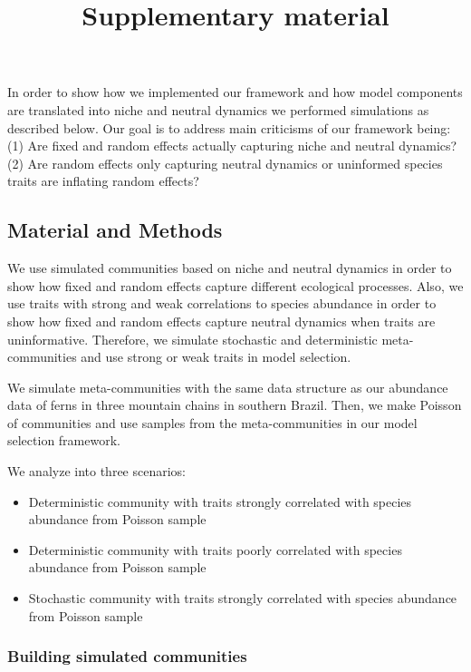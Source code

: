 \title{Supplementary material}
\author{}
\date{}


\maketitle

In order to show how we implemented our framework and how model
components are translated into niche and neutral dynamics we performed
simulations as described below. Our goal is to address main criticisms
of our framework being: (1) Are fixed and random effects actually
capturing niche and neutral dynamics? (2) Are random effects only
capturing neutral dynamics or uninformed species traits are inflating
random effects?

\subsection*{Material and Methods}\label{material-and-methods}

We use simulated communities based on niche and neutral dynamics in
order to show how fixed and random effects capture different ecological
processes. Also, we use traits with strong and weak correlations to
species abundance in order to show how fixed and random effects capture
neutral dynamics when traits are uninformative. Therefore, we simulate
stochastic and deterministic meta-communities and use strong or weak
traits in model selection.

We simulate meta-communities with the same data structure as our
abundance data of ferns in three mountain chains in southern Brazil.
Then, we make Poisson of communities and use samples from the
meta-communities in our model selection framework.

We analyze into three scenarios:

\begin{itemize}
\tightlist
\item
  Deterministic community with traits strongly correlated with species
  abundance from Poisson sample
\item
  Deterministic community with traits poorly correlated with species
  abundance from Poisson sample
\item
  Stochastic community with traits strongly correlated with species
  abundance from Poisson sample
\end{itemize}

\subsubsection*{Building simulated
communities}\label{building-simulated-communities}

